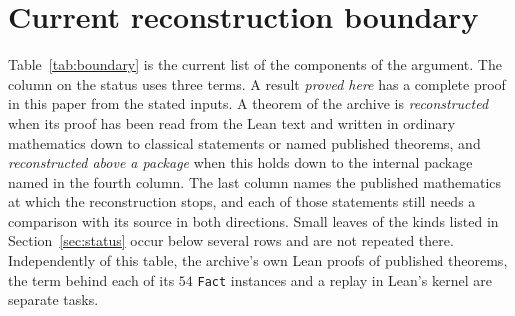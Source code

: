 \documentclass[11pt,letterpaper]{article}
\numberwithin{equation}{section}
\begin{document}
\section{Current reconstruction boundary}\label{sec:boundary}

Table~\ref{tab:boundary} is the current list of the components of the argument. The column on the status uses three terms. A result \emph{proved here} has a complete proof in this paper from the stated inputs. A theorem of the archive is \emph{reconstructed} when its proof has been read from the Lean text and written in ordinary mathematics down to classical statements or named published theorems, and \emph{reconstructed above a package} when this holds down to the internal package named in the fourth column. The last column names the published mathematics at which the reconstruction stops, and each of those statements still needs a comparison with its source in both directions. Small leaves of the kinds listed in Section~\ref{sec:status} occur below several rows and are not repeated there. Independently of this table, the archive's own Lean proofs of published theorems, the term behind each of its $54$ \texttt{Fact} instances and a replay in Lean's kernel are separate tasks.
\end{document}
